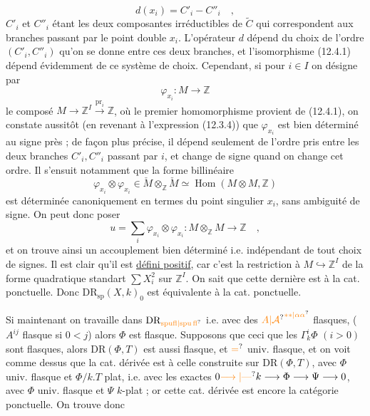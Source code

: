 \[
 d(x_i)=C'_i-C''_i\quad,\tag*{(12.4.2)}
\]
$C'_i$ et $C''_i$ étant les deux composantes irréductibles de $\widetilde C$ qui correspondent aux branches passant par le point double $x_i$. L'opérateur $d$ dépend du choix de l'ordre $(C'_i,C''_i)$ qu'on se donne entre ces deux branches, et l'isomorphisme (12.4.1) dépend évidemment de ce système de choix. Cependant, si pour $i\in I$ on désigne par
\[
 \varphi_{x_i}:M\longrightarrow\mathbb Z\tag*{(12.4.3)}
\]
le composé $M\longrightarrow\mathbb Z^I\xrightarrow{\mathrm{pr}_i}\mathbb Z$, où le premier homomorphisme provient de (12.4.1), on constate aussitôt (en revenant à l'expression (12.3.4)) que $\varphi_{x_i}$ est bien déterminé au signe près ; de façon plus précise, il dépend seulement de l'ordre pris entre les deux branches $C'_i,C''_i$ passant par $i$, et change de signe quand on change cet ordre. Il s'ensuit notamment que la forme billinéaire
\[
 \varphi_{x_i}\otimes\varphi_{x_i}\in\check M\otimes_{\mathbb Z}\check M\simeq\operatorname{Hom}(M\otimes M,\mathbb Z)
 \tag*{(12.4.4)}
\]
est déterminée canoniquement en termes du point singulier $x_i$, sans ambiguité de signe. On peut donc poser
\[
 u=\sum_i\varphi_{x_i}\otimes\varphi_{x_i}:M\otimes_{\mathbb Z}M\longrightarrow\mathbb Z\quad,
 \tag*{(12.4.5)}
\]
et on trouve ainsi un accouplement bien déterminé i.e. indépendant de tout choix de signes. Il est clair qu'il est \uline{défini positif}, car c'est la restriction à $M\hookrightarrow\mathbb Z^I$ de la forme quadratique standart $\sum X_i^2$ sur $\mathbb Z^I$.
On sait que cette dernière est  à la cat. ponctuelle. Donc $\mathrm{DR}_{\mathrm{sp}}(X,k)_0$ est équivalente à la cat. ponctuelle.

Si maintenant on travaille dans $\mathrm{DR}_{\unsure{\mathrm{spufl}|\mathrm{spu\,fl}}}$  i.e. avec des $\unsure{A|\mathcal A}^{\unsure{**|\alpha\alpha}}$  flasques, ($A^{ij}$  flasque si $0<j$) alors $\Phi$ est  flasque. 
Supposons que ceci  que les $\Gamma_k^{i}\Phi$ $(i>0)$ sont  flasques, alors $\mathrm{DR}(\Phi,T)$ est aussi flasque,  et $\unsure{=}$ univ. flasque, et on voit comme dessus que la cat. dérivée est  à celle construite sur  $\mathrm{DR}(\Phi,T)$, avec $\Phi$ univ. flasque et $\Phi/k.T$ plat, i.e. avec les  exactes $0\unsure{\longrightarrow|\text{---}} k\longrightarrow\Phi\longrightarrow\Psi\longrightarrow0$, avec $\Phi$ univ. flasque et $\Psi$ $k$-plat ; or cette cat. dérivée est encore la catégorie ponctuelle. On trouve donc

